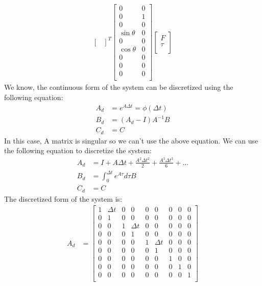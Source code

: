 \documentclass[12pt]{article}
\begin{document}
{\begin{align*}
\begin{bmatrix}
        \end{bmatrix}^{T} \begin{bmatrix}
            0 & 0 \\
            0 & 1 \\
            0 & 0 \\
            \sin{\theta} & 0 \\
            0 & 0 \\
            \cos{\theta} & 0 \\
            0 & 0 \\
            0 & 0 \\
            0 & 0 \\
        \end{bmatrix} \begin{bmatrix}
            F \\
            \tau \\
        \end{bmatrix}
\end{align*}
We know, the continuous form of the system can be discretized using the following equation:
\begin{align*}
    A_d &= e^{A \Delta t}  = \phi(\Delta t) \\
    B_d &= (A_d - I) A^{-1} B \\
    C_d &= C
\end{align*}
In this case, A matrix is singular so we can't use the above equation. We can use the following equation to discretize the system:
\begin{align*}
    A_d &= I + A \Delta t + \frac{A^2 \Delta t^2}{2} + \frac{A^3 \Delta t^3}{6} + \ldots \\
    B_d &= \int_{0}^{\Delta t} e^{A \tau} d\tau B \\
    C_d &= C
\end{align*}
The discretized form of the system is:
\begin{align*}
    A_d &= \begin{bmatrix}
        1 & \Delta t & 0 & 0 & 0 & 0 & 0 & 0 & 0 \\
        0 & 1 & 0 & 0 & 0 & 0 & 0 & 0 & 0 \\
        0 & 0 & 1 & \Delta t & 0 & 0 & 0 & 0 & 0 \\
        0 & 0 & 0 & 1 & 0 & 0 & 0 & 0 & 0 \\
        0 & 0 & 0 & 0 & 1 & \Delta t & 0 & 0 & 0 \\
        0 & 0 & 0 & 0 & 0 & 1 & 0 & 0 & 0 \\
        0 & 0 & 0 & 0 & 0 & 0 & 1 & 0 & 0 \\
        0 & 0 & 0 & 0 & 0 & 0 & 0 & 1 & 0 \\
        0 & 0 & 0 & 0 & 0 & 0 & 0 & 0 & 1 \\
    \end{bmatrix} \\
\end{align*}


}
\end{document}
